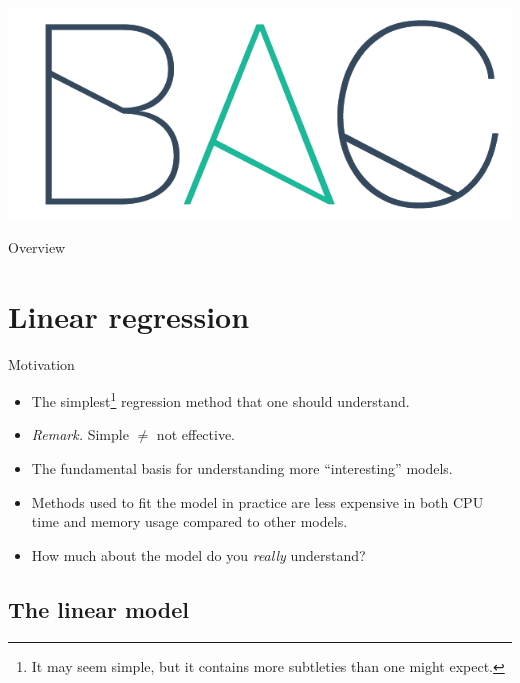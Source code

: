 \documentclass{beamer}
\title[\lecturetitle]{\lecturetitle}
\author[Derek Huang (BAC Advanced Team)]{Derek Huang}
\institute{BAC Advanced Team}
\date{March 4, 2021}
\numberwithin{equation}{section}
\begin{document}
\begin{frame}
    \titlepage
    \centering
    \includegraphics[scale = 0.1]{../bac_logo1.png}
\end{frame}

\begin{frame}{Overview}
    \tableofcontents
\end{frame}

\section{Linear regression}

\begin{frame}{Motivation}
    \begin{itemize}
        \item
        The simplest\footnote{
            It may seem simple, but it contains more subtleties than one
            might expect.
        } regression method that one should understand.

        \item
        \textit{Remark.} Simple $ \ne $ not effective.

        \item
        The fundamental basis for understanding more ``interesting'' models.

        \item
        Methods used to fit the model in practice are less expensive in both
        CPU time and memory usage compared to other models.

        \item
        How much about the model do you \textit{really} understand?
    \end{itemize}
\end{frame}

\subsection{The linear model}
\end{document}
